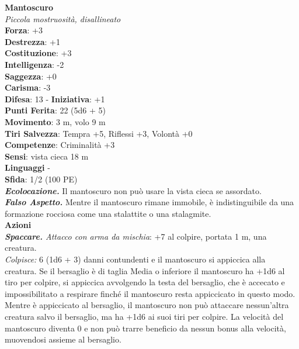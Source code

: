 \begin{multicols}{2}
\medskip\textbf{Mantoscuro}\\
\emph{Piccola mostruosità, disallineato}\\
\textbf{Forza}: +3\\
\textbf{Destrezza}: +1\\
\textbf{Costituzione}: +3\\
\textbf{Intelligenza}: -2\\
\textbf{Saggezza}: +0\\
\textbf{Carisma}: -3\\
\textbf{Difesa}: 13 - \textbf{Iniziativa}: +1\\
\textbf{Punti Ferita}: 22 (5d6 + 5)\\
\textbf{Movimento}: 3 m, volo 9 m\\
\textbf{Tiri Salvezza}: Tempra +5, Riflessi +3, Volontà +0\\
\textbf{Competenze}: Criminalità +3\\
\textbf{Sensi}: vista cieca 18 m\\
\textbf{Linguaggi} -\\
\textbf{Sfida}: 1/2 (100 PE)\smallskip\\
\emph{\textbf{Ecolocazione.}} Il mantoscuro non può usare la vista cieca se assordato.\\
\emph{\textbf{Falso Aspetto.}} Mentre il mantoscuro rimane immobile, è indistinguibile da una formazione rocciosa come una stalattite o una stalagmite.\\
\smallskip\textbf{Azioni}\\
\emph{\textbf{Spaccare.} Attacco con arma da mischia}: +7 al colpire, portata 1 m, una creatura.\\
\emph{Colpisce:} 6 (1d6 + 3) danni contundenti e il mantoscuro si appiccica alla creatura. Se il bersaglio è di taglia Media o inferiore il mantoscuro ha +1d6 al tiro per colpire, si appiccica avvolgendo la testa del bersaglio, che è accecato e impossibilitato a respirare finché il mantoscuro resta appiccicato in questo modo. \\
Mentre è appiccicato al bersaglio, il mantoscuro non può attaccare nessun'altra creatura salvo il bersaglio, ma ha +1d6 ai suoi tiri per colpire. La velocità del mantoscuro diventa 0 e non può trarre beneficio da nessun bonus alla velocità, muovendosi assieme al bersaglio.\\


\end{multicols}

